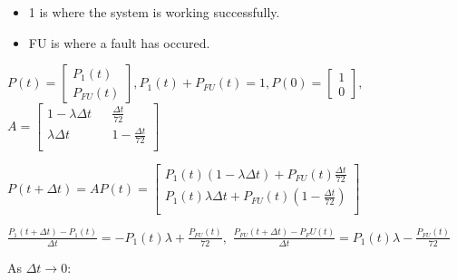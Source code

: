\documentclass[a4paper,12pt]{article}
\begin{document}
\begin{enumerate}

            \begin{itemize}
                \item 1 is where the system is working successfully.
                \item FU is where a fault has occured.
            \end{itemize}

            $P(t) = \begin{bmatrix} P_1(t) \\ P_{FU}(t) \end{bmatrix}, P_1(t) + P_{FU}(t) = 1, P(0) = \begin{bmatrix} 1 \\ 0 \end{bmatrix},$
            $A = \begin{bmatrix}
                1 - \lambda\Delta t && \frac{\Delta t}{72}     \\
                \lambda\Delta t     && 1 - \frac{\Delta t}{72} \\
            \end{bmatrix}$

            $P(t + \Delta t) = AP(t) = \begin{bmatrix}
                P_1(t)(1 - \lambda\Delta t) + P_{FU}(t)\frac{\Delta t}{72}       \\
                P_1(t)\lambda\Delta t       + P_{FU}(t)(1 - \frac{\Delta t}{72}) \\
            \end{bmatrix}$

            $\frac{P_1(t + \Delta t) - P_1(t)}{\Delta t} = -P_1(t)\lambda + \frac{P_{FU}(t)}{72},$
            $\frac{P_{FU}(t + \Delta t) - P_FU(t)}{\Delta t} = P_1(t)\lambda - \frac{P_{FU}(t)}{72}$

            As $\Delta t \to 0$:


\end{enumerate}
\end{document}
